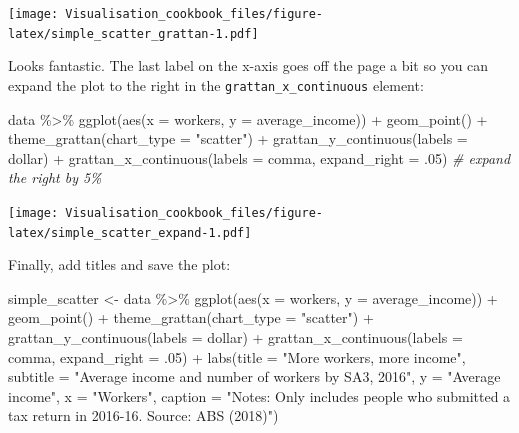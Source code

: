 \documentclass[
]{book}
\newenvironment{Shaded}{\begin{snugshade}}{\end{snugshade}}
\newcommand{\AttributeTok}[1]{\textcolor[rgb]{0.77,0.63,0.00}{#1}}
\newcommand{\CommentTok}[1]{\textcolor[rgb]{0.56,0.35,0.01}{\textit{#1}}}
\newcommand{\DecValTok}[1]{\textcolor[rgb]{0.00,0.00,0.81}{#1}}
\newcommand{\FunctionTok}[1]{\textcolor[rgb]{0.00,0.00,0.00}{#1}}
\newcommand{\NormalTok}[1]{#1}
\newcommand{\OtherTok}[1]{\textcolor[rgb]{0.56,0.35,0.01}{#1}}
\newcommand{\SpecialCharTok}[1]{\textcolor[rgb]{0.00,0.00,0.00}{#1}}
\newcommand{\StringTok}[1]{\textcolor[rgb]{0.31,0.60,0.02}{#1}}
\begin{document}
\texttt{[image: Visualisation\_cookbook\_files/figure-latex/simple\_scatter\_grattan-1.pdf]}

Looks fantastic. The last label on the x-axis goes off the page a bit so you can expand the plot to the right in the \texttt{grattan\_x\_continuous} element:

\begin{Shaded}
\begin{Highlighting}[]
\NormalTok{data }\SpecialCharTok{\%\textgreater{}\%} 
  \FunctionTok{ggplot}\NormalTok{(}\FunctionTok{aes}\NormalTok{(}\AttributeTok{x =}\NormalTok{ workers,}
             \AttributeTok{y =}\NormalTok{ average\_income)) }\SpecialCharTok{+} 
  \FunctionTok{geom\_point}\NormalTok{()  }\SpecialCharTok{+}
  \FunctionTok{theme\_grattan}\NormalTok{(}\AttributeTok{chart\_type =} \StringTok{"scatter"}\NormalTok{) }\SpecialCharTok{+} 
  \FunctionTok{grattan\_y\_continuous}\NormalTok{(}\AttributeTok{labels =}\NormalTok{ dollar) }\SpecialCharTok{+} 
  \FunctionTok{grattan\_x\_continuous}\NormalTok{(}\AttributeTok{labels =}\NormalTok{ comma,}
                       \AttributeTok{expand\_right =}\NormalTok{ .}\DecValTok{05}\NormalTok{) }\CommentTok{\# expand the right by 5\%}
\end{Highlighting}
\end{Shaded}

\texttt{[image: Visualisation\_cookbook\_files/figure-latex/simple\_scatter\_expand-1.pdf]}

Finally, add titles and save the plot:

\begin{Shaded}
\begin{Highlighting}[]
\NormalTok{simple\_scatter }\OtherTok{\textless{}{-}}\NormalTok{ data }\SpecialCharTok{\%\textgreater{}\%} 
  \FunctionTok{ggplot}\NormalTok{(}\FunctionTok{aes}\NormalTok{(}\AttributeTok{x =}\NormalTok{ workers,}
             \AttributeTok{y =}\NormalTok{ average\_income)) }\SpecialCharTok{+} 
  \FunctionTok{geom\_point}\NormalTok{()  }\SpecialCharTok{+}
  \FunctionTok{theme\_grattan}\NormalTok{(}\AttributeTok{chart\_type =} \StringTok{"scatter"}\NormalTok{) }\SpecialCharTok{+} 
  \FunctionTok{grattan\_y\_continuous}\NormalTok{(}\AttributeTok{labels =}\NormalTok{ dollar) }\SpecialCharTok{+} 
  \FunctionTok{grattan\_x\_continuous}\NormalTok{(}\AttributeTok{labels =}\NormalTok{ comma,}
                       \AttributeTok{expand\_right =}\NormalTok{ .}\DecValTok{05}\NormalTok{) }\SpecialCharTok{+} 
  \FunctionTok{labs}\NormalTok{(}\AttributeTok{title =} \StringTok{"More workers, more income"}\NormalTok{,}
       \AttributeTok{subtitle =} \StringTok{"Average income and number of workers by SA3, 2016"}\NormalTok{,}
       \AttributeTok{y =} \StringTok{"Average income"}\NormalTok{,}
       \AttributeTok{x =} \StringTok{"Workers"}\NormalTok{,}
       \AttributeTok{caption =} \StringTok{"Notes: Only includes people who submitted a tax return in 2016{-}16. Source: ABS (2018)"}\NormalTok{)}
\end{Highlighting}
\end{Shaded}
\end{document}
